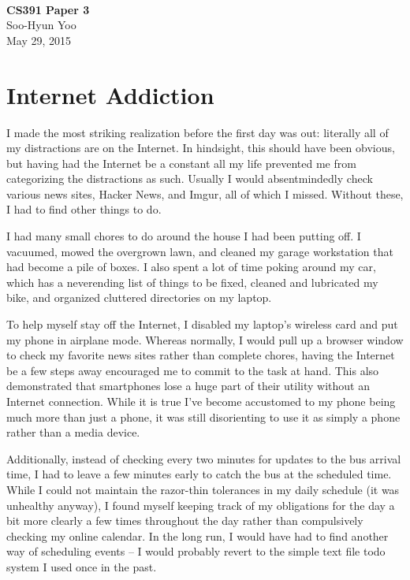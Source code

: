 \documentclass[12pt,letterpaper]{article}
\begin{document}
\fancyfoot{}
\begin{center}
  \hfill \\
  \vspace{4in}
  {\bf\Huge CS391 Paper 3 \\}
  \vspace{2in}
  {\Large Soo-Hyun Yoo \\ May 29, 2015}
\end{center}

\newpage
{}

\section*{Internet Addiction}

I made the most striking realization before the first day was out: literally
all of my distractions are on the Internet. In hindsight, this should have been
obvious, but having had the Internet be a constant all my life prevented me
from categorizing the distractions as such. Usually I would absentmindedly
check various news sites, Hacker News, and Imgur, all of which I missed.
Without these, I had to find other things to do.

I had many small chores to do around the house I had been putting off.
I vacuumed, mowed the overgrown lawn, and cleaned my garage workstation that
had become a pile of boxes. I also spent a lot of time poking around my car,
which has a neverending list of things to be fixed, cleaned and lubricated my
bike, and organized cluttered directories on my laptop.

To help myself stay off the Internet, I disabled my laptop's wireless card and
put my phone in airplane mode. Whereas normally, I would pull up a browser
window to check my favorite news sites rather than complete chores, having the
Internet be a few steps away encouraged me to commit to the task at hand. This
also demonstrated that smartphones lose a huge part of their utility without an
Internet connection. While it is true I've become accustomed to my phone being
much more than just a phone, it was still disorienting to use it as simply
a phone rather than a media device.

Additionally, instead of checking every two minutes for updates to the bus
arrival time, I had to leave a few minutes early to catch the bus at the
scheduled time. While I could not maintain the razor-thin tolerances in my
daily schedule (it was unhealthy anyway), I found myself keeping track of my
obligations for the day a bit more clearly a few times throughout the day
rather than compulsively checking my online calendar. In the long run, I would
have had to find another way of scheduling events -- I would probably revert to
the simple text file todo system I used once in the past.
\end{document}
